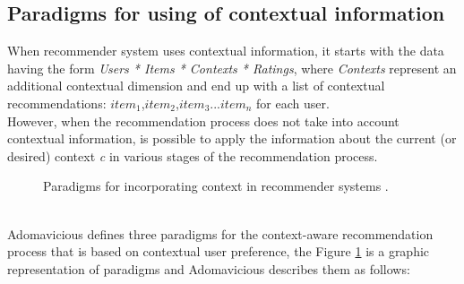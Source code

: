 \subsection{Paradigms for using of contextual information}

When recommender system uses contextual information, it starts
with the data having the form \textit{Users * Items * Contexts * Ratings}, 
where  \textit{Contexts} represent an additional contextual dimension 
and end up  with a list of contextual recommendations:  
$item_{1}$,$item_{2}$,$item_{3}$...$item_{n}$  for each user. \\
However, when  the recommendation process does not  take into 
account  contextual information, is possible to apply the information 
about the current (or desired) context \textit{c} in various stages 
of the recommendation process.
\begin{figure}
\captionsetup{font=footnotesize}
\centering
{}
\small
\caption{Paradigms for incorporating context in recommender 
systems \cite{adomavicius2011context}.}
\label{fig:paradigms}   
\end{figure}
\\ Adomavicious \cite{adomavicius2011context} defines three paradigms for
the context-aware recommendation process that is based on contextual
user preference, the Figure  \ref{fig:paradigms} is a graphic representation 
of paradigms and Adomavicious describes them as follows:
